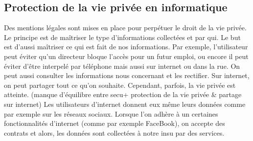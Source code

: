 \documentclass{article}
\begin{document}
\subsection{Protection de la vie privée en informatique}
Des mentions légales sont mises en place pour perpétuer le droit de la vie privée.
Le principe est de maîtriser le type d'informations collectées et par qui. Le but est d'aussi maîtriser ce qui est fait de nos informations.
Par exemple, l'utilisateur peut éviter qu'un directeur bloque l'accès pour un futur emploi, ou encore il peut éviter d'être interpelé par téléphone mais aussi sur internet ou dans la rue. On peut aussi consulter les informations nous concernant et les rectifier.
Sur internet, on peut partager tout ce qu'on souhaite. Cependant, parfois, la vie privée est atteinte. 
(manque d'équilibre entre secu+ protection de la vie privée \& partage sur internet)
Les utilisateurs d'internet donnent eux même leurs données  comme par exemple sur les réseaux sociaux. 
Lorsque l'on adhère à un certaines fonctionnalités d'internet (comme par exemple FaceBook), on accepte des contrats et alors, les données sont collectées à notre insu par des services.
\end{document}
